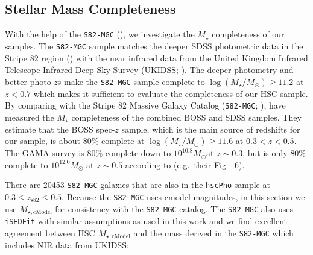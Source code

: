 \documentclass[a4paper,fleqn,usenatbib]{mnras}
\def\msun{$M_\odot$}
\def\mstar{{$M_{\star}$}}
\def\logms{{$\log (M_{\star}/M_{\odot})$}}
\def\mcmodel{{$M_{\star,\mathrm{cModel}}$}}
\begin{document}

\subsection{Stellar Mass Completeness}
    \label{ssec:complete}
    
    With the help of the \texttt{S82-MGC} (\citealt{Bundy2015}), we investigate the 
    \mstar{} completeness of our samples. 
    The \texttt{S82-MGC} sample matches the deeper SDSS photometric data in the 
    Stripe 82 region (\citealt{Annis2014}) with the near infrared data from the United 
    Kingdom Infrared Telescope Infrared Deep Sky Survey (UKIDSS; 
    \citealt{Lawrence2007}). 
    The deeper photometry and better photo-$z$s make the \texttt{S82-MGC} sample 
    complete to \logms{}$\geq 11.2$ at $z<0.7$ which makes it sufficient to evaluate 
    the completeness of our HSC sample.   
	By comparing with the Stripe 82 Massive Galaxy Catalog
    (\texttt{S82-MGC}; \citealt{Bundy2015}), \citet{Leauthaud2016} have measured the
    \mstar{} completeness of the combined BOSS and SDSS samples. 
    They estimate that the BOSS spec-$z$ sample, which is the main source of redshifts for our sample, is about 80\% complete at 
    \logms{}$\geq 11.6$ at $0.3 < z < 0.5$. The GAMA survey is 80\% complete down to 
    $10^{10.8}$\msun at $z{\sim} 0.3$, but is only 80\% complete to 
    $10^{12.0}$\msun{} at $z{\sim} 0.5$ according to \citet{Taylor2011} (e.g.\ 
    their Fig~~6).
    
    There are 20453 \texttt{S82-MGC} galaxies that are also in the \texttt{hscPho} 
    sample at $0.3 \leq z_{\mathrm{s82}} \leq 0.5$.  Because the \texttt{S82-MGC} uses  cmodel  magnitudes,  in this section we use  \mcmodel{} for consistency with the  \texttt{S82-MGC} catalog.  The \texttt{S82-MGC} also uses \texttt{iSEDFit} with similar assumptions as used in this work and we find excellent agreement between HSC  \mcmodel{} and the mass derived in  the \texttt{S82-MGC} which includes NIR data from UKIDSS; 
    
\end{document}
